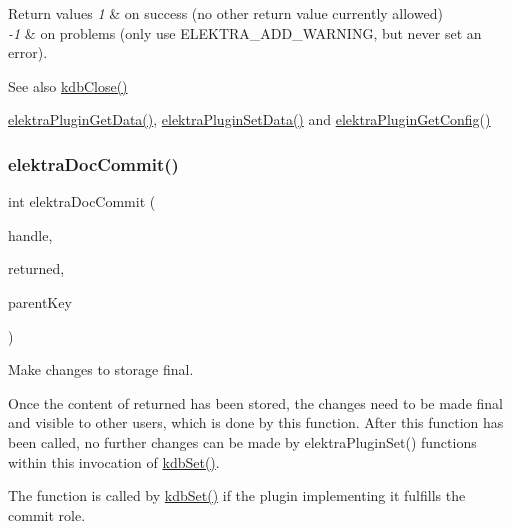 \begin{DoxyRetVals}{Return values}
{\em 1} & on success (no other return value currently allowed)\\
\hline
{\em -\/1} & on problems (only use E\+L\+E\+K\+T\+R\+A\+\_\+\+A\+D\+D\+\_\+\+W\+A\+R\+N\+I\+NG, but never set an error).\\
\hline
\end{DoxyRetVals}
\begin{DoxySeeAlso}{See also}
\mbox{\hyperlink{group__kdb_gadb54dc9fda17ee07deb9444df745c96f}{kdb\+Close()}} 

\mbox{\hyperlink{group__plugin_gaafcf3216b46292f222b8cc7828b4dd20}{elektra\+Plugin\+Get\+Data()}}, \mbox{\hyperlink{group__plugin_gaf4b941a52ff55d0ca2a9158d90208ef2}{elektra\+Plugin\+Set\+Data()}} and \mbox{\hyperlink{group__plugin_ga644bead796506c172817724051c977c9}{elektra\+Plugin\+Get\+Config()}} 
\end{DoxySeeAlso}
\mbox{\label{group__plugin_ga52807469897b8acbada5bcc6b8c8ceab}} 
\subsubsection{\texorpdfstring{elektraDocCommit()}{elektraDocCommit()}}
{\footnotesize\ttfamily int elektra\+Doc\+Commit (\begin{DoxyParamCaption}\item[{Plugin $\ast$}]{handle,  }\item[{Key\+Set $\ast$}]{returned,  }\item[{Key $\ast$}]{parent\+Key }\end{DoxyParamCaption})}



Make changes to storage final. 

Once the content of {\ttfamily returned} has been stored, the changes need to be made final and visible to other users, which is done by this function. After this function has been called, no further changes can be made by elektra\+Plugin\+Set() functions within this invocation of \mbox{\hyperlink{group__kdb_ga11436b058408f83d303ca5e996832bcf}{kdb\+Set()}}.

The function is called by \mbox{\hyperlink{group__kdb_ga11436b058408f83d303ca5e996832bcf}{kdb\+Set()}} if the plugin implementing it fulfills the {\ttfamily commit} role.

